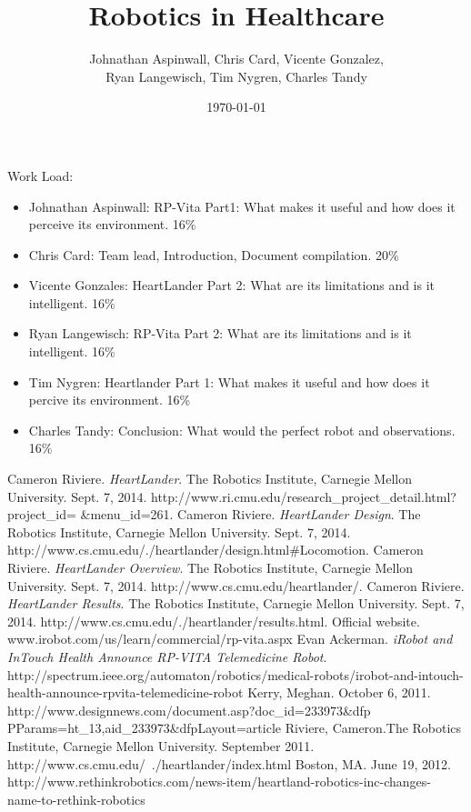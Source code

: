 \documentclass[12pt,conference]{IEEEtran}
\title{Robotics in Healthcare}
\date{\today}
\author{Johnathan Aspinwall, Chris Card, Vicente Gonzalez, \\
Ryan Langewisch, Tim Nygren, Charles Tandy}
\begin{document}
\maketitle
\thispagestyle{plain}
\pagestyle{plain}






\appendix
Work Load:
\begin{itemize}
\item Johnathan Aspinwall: RP-Vita Part1: What makes it useful and how does it perceive its environment. 16\%
\item Chris Card: Team lead, Introduction, Document compilation. 20\%
\item Vicente Gonzales: HeartLander Part 2: What are its limitations and is it intelligent. 16\%
\item Ryan Langewisch: RP-Vita Part 2: What are its limitations and is it intelligent. 16\%
\item Tim Nygren: Heartlander Part 1: What makes it useful and how does it percive its environment. 16\%
\item Charles Tandy: Conclusion: What would the perfect robot and observations. 16\%
\end{itemize}

\begin{thebibliography}{4}
  Cameron Riviere. {\em HeartLander}. The Robotics Institute, Carnegie Mellon University. Sept. 7, 2014. http://www.ri.cmu.edu/research\_project\_detail.html?project\_id=
\&menu\_id=261.
  Cameron Riviere. {\em HeartLander Design}. The Robotics Institute, Carnegie Mellon University. Sept. 7, 2014. http://www.cs.cmu.edu/\texttildelow{}./heartlander/design.html\#Locomotion.
  Cameron Riviere. {\em HeartLander Overview}. The Robotics Institute, Carnegie Mellon University. Sept. 7, 2014. http://www.cs.cmu.edu/\texttildelow{}heartlander/.
  Cameron Riviere. {\em HeartLander Results}. The Robotics Institute, Carnegie Mellon University. Sept. 7, 2014. http://www.cs.cmu.edu/\texttildelow{}./heartlander/results.html.
 Official website.  www.irobot.com/us/learn/commercial/rp-vita.aspx
 Evan Ackerman. {\em iRobot and InTouch Health Announce RP-VITA Telemedicine Robot}. http://spectrum.ieee.org/automaton/robotics/medical-robots/irobot-and-intouch-health-announce-rpvita-telemedicine-robot
 Kerry, Meghan. October 6, 2011. http://www.designnews.com/document.asp?doc\_id=233973\&dfp
\newline PParams=ht\_13,aid\_233973\&dfpLayout=article
 Riviere, Cameron.The Robotics Institute, Carnegie Mellon University. September 2011.  http://www.cs.cmu.edu/~./heartlander/index.html
 Boston, MA. June 19, 2012. http://www.rethinkrobotics.com/news-item/heartland-robotics-inc-changes- name-to-rethink-robotics
\end{thebibliography}
\end{document}
